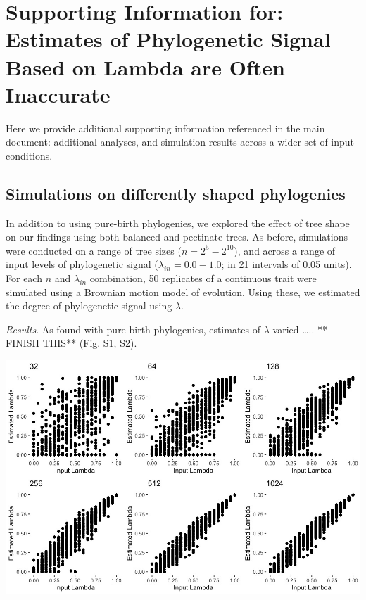 \documentclass[
]{article}
\author{}
\date{\vspace{-2.5em}}
\begin{document}
\hypertarget{supporting-information-for-estimates-of-phylogenetic-signal-based-on-lambda-are-often-inaccurate}{%
\section{Supporting Information for: Estimates of Phylogenetic Signal
Based on Lambda are Often
Inaccurate}\label{supporting-information-for-estimates-of-phylogenetic-signal-based-on-lambda-are-often-inaccurate}}

Here we provide additional supporting information referenced in the main
document: additional analyses, and simulation results across a wider set
of input conditions.

\hypertarget{simulations-on-differently-shaped-phylogenies}{%
\subsection{Simulations on differently shaped
phylogenies}\label{simulations-on-differently-shaped-phylogenies}}

In addition to using pure-birth phylogenies, we explored the effect of
tree shape on our findings using both balanced and pectinate trees. As
before, simulations were conducted on a range of tree sizes
(\(n=2^5 - 2^{10}\)), and across a range of input levels of phylogenetic
signal (\(\lambda_{in} = 0.0 - 1.0\); in 21 intervals of 0.05 units).
For each \(n\) and \(\lambda_{in}\) combination, 50 replicates of a
continuous trait were simulated using a Brownian motion model of
evolution. Using these, we estimated the degree of phylogenetic signal
using \(\lambda\). \hfill\break

\emph{Results}. As found with pure-birth phylogenies, estimates of
\(\lambda\) varied \ldots.. ** FINISH THIS** (Fig. S1, S2).

\includegraphics[width=0.75\linewidth]{Fig1}
\end{document}
